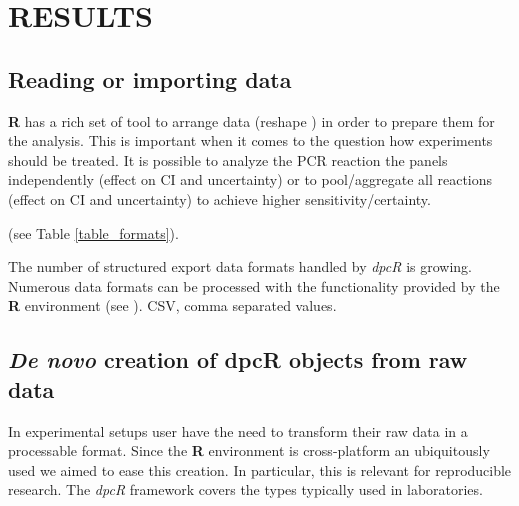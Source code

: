 \documentclass[a4,center,fleqn]{NAR}
\begin{document}
\section{RESULTS}

\subsection{Reading or importing data}

\textbf{R} has a rich set of tool to arrange data (reshape \cite{Wickham_2007}) 
in order to prepare them for the analysis. This is important when it comes to 
the question how experiments should be treated. It is possible to analyze the 
PCR reaction the panels independently (effect on CI and uncertainty) or to 
pool/aggregate all reactions (effect on CI and uncertainty) to achieve higher 
sensitivity/certainty.


(see Table \ref{table_formats}).

\begin{table}[b]
 {The number of structured export data formats handled by \textit{dpcR} is 
growing. Numerous data formats can be processed with the functionality provided 
by the \textbf{R} environment (see \cite{rodiger_r_2015}). CSV, comma separated 
values.}
\end{table}

\subsection{\textit{De novo} creation of dpcR objects from raw data}

In experimental setups user have the need to transform their raw data in a 
processable format. Since the \textbf{R} environment is cross-platform an 
ubiquitously used we aimed to ease this creation. In particular, this is 
relevant for reproducible research. The \textit{dpcR} framework covers the types 
typically used in laboratories.
\end{document}
